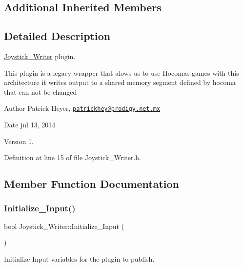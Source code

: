 \subsection*{Additional Inherited Members}


\subsection{Detailed Description}
\hyperlink{class_joystick___writer}{Joystick\+\_\+\+Writer} plugin. 

This plugin is a legacy wrapper that alows us to use Hocoma\textquotesingle{}s games with this architecture it writes output to a shared memory segment defined by hocoma that can not be changed \begin{DoxyAuthor}{Author}
Patrick Heyer, \href{mailto:patrickhey@prodigy.net.mx}{\tt patrickhey@prodigy.\+net.\+mx} 
\end{DoxyAuthor}
\begin{DoxyDate}{Date}
jul 13, 2014 
\end{DoxyDate}
\begin{DoxyVersion}{Version}
1. 
\end{DoxyVersion}


Definition at line 15 of file Joystick\+\_\+\+Writer.\+h.



\subsection{Member Function Documentation}
\mbox{\label{class_joystick___writer_a4f7355cdbd819e5ce41575e152c98660}} 
\subsubsection{\texorpdfstring{Initialize\+\_\+\+Input()}{Initialize\_Input()}}
{\footnotesize\ttfamily bool Joystick\+\_\+\+Writer\+::\+Initialize\+\_\+\+Input (\begin{DoxyParamCaption}{ }\end{DoxyParamCaption})\hspace{0.3cm}{\ttfamily [virtual]}}



Initialize Input variables for the plugin to publish. 


